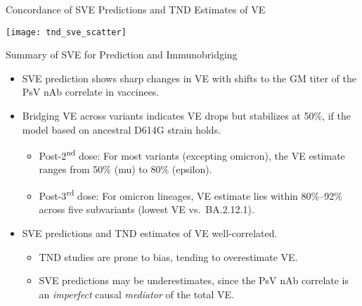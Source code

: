 \documentclass{beamer}
\begin{document}
\begin{frame}[c]{Concordance of SVE Predictions and TND Estimates of VE}

\hspace*{-0.5cm}\texttt{[image: tnd\_sve\_scatter]}

\note{
}

\end{frame}


\begin{frame}[c]{Summary of SVE for Prediction and Immunobridging}

\begin{center}
\begin{itemize}
  \itemsep6pt
  \item SVE prediction shows sharp changes in VE with shifts to the GM titer of
    the PsV nAb correlate in vaccinees.
  \item Bridging VE across variants indicates VE drops but stabilizes at 50\%,
    if the model based on ancestral D614G strain holds.
    \begin{itemize}
      \itemsep2pt
      \item Post-2\textsuperscript{nd} dose: For most variants (excepting
        omicron), the VE estimate ranges from 50\% (mu) to 80\% (epsilon).
      \item Post-3\textsuperscript{rd} dose: For omicron lineages, VE estimate
        lies within 80\%--92\% across five subvariants (lowest VE
        vs.~BA.2.12.1).
    \end{itemize}
  \item SVE predictions and TND estimates of VE well-correlated.
    \begin{itemize}
      \itemsep2pt
      \item TND studies are prone to bias, tending to overestimate VE.
      \item SVE predictions may be underestimates, since the PsV nAb correlate
        is an \textit{imperfect} causal \textit{mediator} of the total VE.
    \end{itemize}
\end{itemize}
\end{center}

\note{
}

\end{frame}
\end{document}
